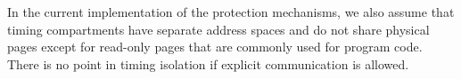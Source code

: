 In the current implementation of the protection mechanisms, we also assume that
timing compartments have separate address spaces and do not share physical
pages except for read-only pages that are commonly used for program code.
There is no point in timing isolation if explicit communication is allowed.







